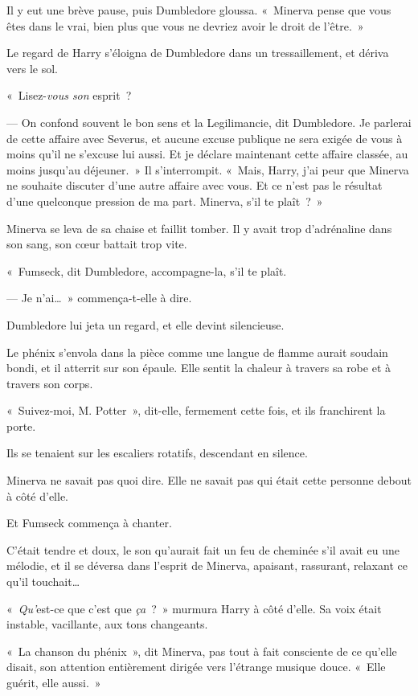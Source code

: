 Il y eut une brève pause, puis Dumbledore gloussa.
«~Minerva pense que vous êtes dans le vrai, bien plus que vous ne devriez avoir le droit de l'être.~»

Le regard de Harry s'éloigna de Dumbledore dans un tressaillement, et dériva vers le sol.

«~Lisez-\emph{vous son} esprit~?

--- On confond souvent le bon sens et la Legilimancie, dit Dumbledore.
Je parlerai de cette affaire avec Severus, et aucune excuse publique ne sera exigée de vous à moins qu'il ne s'excuse lui aussi.
Et je déclare maintenant cette affaire classée, au moins jusqu'au déjeuner.~»
Il s'interrompit.
«~Mais, Harry, j'ai peur que Minerva ne souhaite discuter d'une autre affaire avec vous.
Et ce n'est pas le résultat d'une quelconque pression de ma part.
Minerva, s'il te plaît~?~»

Minerva se leva de sa chaise et faillit tomber.
Il y avait trop d'adrénaline dans son sang, son cœur battait trop vite.

«~Fumseck, dit Dumbledore, accompagne-la, s'il te plaît.

--- Je n'ai…~»
commença-t-elle à dire.

Dumbledore lui jeta un regard, et elle devint silencieuse.

Le phénix s'envola dans la pièce comme une langue de flamme aurait soudain bondi, et il atterrit sur son épaule.
Elle sentit la chaleur à travers sa robe et à travers son corps.

«~Suivez-moi, M. Potter~», dit-elle, fermement cette fois, et ils franchirent la porte.

\later

Ils se tenaient sur les escaliers rotatifs, descendant en silence.

Minerva ne savait pas quoi dire.
Elle ne savait pas qui était cette personne debout à côté d'elle.

Et Fumseck commença à chanter.

C'était tendre et doux, le son qu'aurait fait un feu de cheminée s'il avait eu une mélodie, et il se déversa dans l'esprit de Minerva, apaisant, rassurant, relaxant ce qu'il touchait…

«~\emph{Qu'}est-ce que c'est que \emph{ça}~?~»
murmura Harry à côté d'elle.
Sa voix était instable, vacillante, aux tons changeants.

«~La chanson du phénix~», dit Minerva, pas tout à fait consciente de ce qu'elle disait, son attention entièrement dirigée vers l'étrange musique douce.
«~Elle guérit, elle aussi.~»

